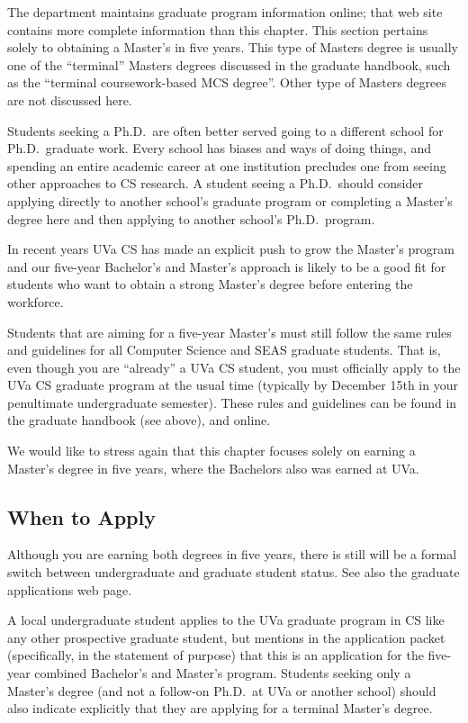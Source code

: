 The department maintains graduate program information
online\myurlFormatted{\csmsURL}; that
web site contains more complete information than this chapter.  This
section pertains solely to obtaining a Master's in five years. This type
of Masters degree is usually one of the ``terminal'' Masters degrees
discussed in the graduate handbook, such as the ``terminal coursework-based
MCS degree''. Other type of Masters degrees are not discussed here.

Students seeking a Ph.D.\ are often better served going to a different
school for Ph.D.\ graduate work. Every school has biases and ways of doing
things, and spending an entire academic career at one institution precludes
one from seeing other approaches to CS research. A student seeing a 
Ph.D.\ should consider applying directly to another school's graduate
program or completing a Master's degree here and then applying to another
school's Ph.D.\ program. 

In recent years UVa CS has made an explicit push to grow the Master's
program and our five-year Bachelor's and Master's approach is likely to
be a good fit for students who want to obtain a strong Master's degree 
before entering the workforce. 

Students that are aiming for a five-year Master's must still follow the
same rules and guidelines for all Computer Science and SEAS graduate
students. That is, even though you are ``already'' a UVa CS student, you
must officially apply to the UVa CS graduate program at the usual time
(typically by December 15th in your penultimate undergraduate semester). 
These rules and guidelines can be found in the graduate handbook (see
above), and
online.

We would like to stress again that this chapter focuses solely on
earning a Master's degree in five years, where the Bachelors also was
earned at UVa.

\subsection{When to Apply}

Although you are earning both degrees in five years, there is still will
be a formal switch between undergraduate and graduate student status.
See also the graduate applications web
page.

A local undergraduate student applies to the UVa graduate program in CS
like any other prospective graduate student, but mentions in the
application packet (specifically, in the statement of purpose) that 
this is an application for the five-year combined Bachelor's and Master's
program. Students seeking only a Master's degree (and not a follow-on
Ph.D.\ at UVa or another school) should also indicate explicitly that they
are applying for a terminal Master's degree. 

